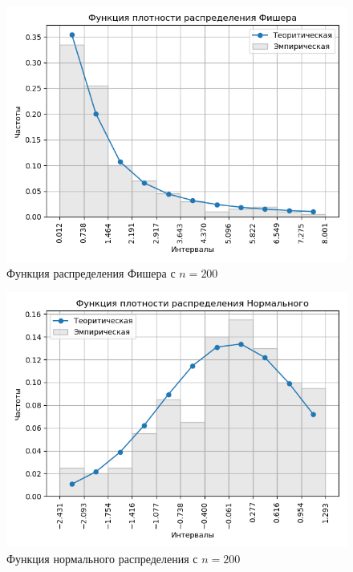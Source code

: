 \documentclass[a4]{article}
\begin{document}
\begin{center}
\begin{figure}[H]
\caption{Функция распределения Фишера с $ n = 200$}
\includegraphics[width=\textwidth]{output/task1/fisher_200_histogram.png}
\end{figure}

\begin{figure}[H]
\caption{Функция нормального распределения с $ n = 200$}
\includegraphics[width=\textwidth]{output/task1/norm_200_histogram.png}
\end{figure}


\end{center}
\end{document}

